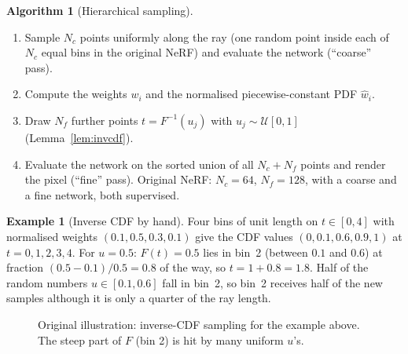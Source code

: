 \documentclass[11pt,a4paper]{article}
\theoremstyle{definition}
\newtheorem{example}{Example}[section]
\newtheorem{algorithm}{Algorithm}[section]
\theoremstyle{plain}
\begin{document}
\begin{algorithm}[Hierarchical sampling]\label{alg:hier}
\begin{enumerate}[nosep]
\item Sample $N_c$ points uniformly along the ray (one random point inside each of $N_c$ equal bins in the original NeRF) and evaluate the network (``coarse'' pass).
\item Compute the weights $w_i$ and the normalised piecewise-constant PDF $\hat w_i$.
\item Draw $N_f$ further points $t=F^{-1}(u_j)$ with $u_j\sim\mathcal U[0,1]$ (Lemma~\ref{lem:invcdf}).
\item Evaluate the network on the sorted union of all $N_c+N_f$ points and render the pixel (``fine'' pass). Original NeRF: $N_c=64$, $N_f=128$, with a coarse and a fine network, both supervised.
\end{enumerate}
\end{algorithm}

\begin{example}[Inverse CDF by hand]
Four bins of unit length on $t\in[0,4]$ with normalised weights $(0.1,0.5,0.3,0.1)$ give the CDF values $(0,0.1,0.6,0.9,1)$ at $t=0,1,2,3,4$. For $u=0.5$: $F(t)=0.5$ lies in bin~2 (between $0.1$ and $0.6$) at fraction $(0.5-0.1)/0.5=0.8$ of the way, so $t=1+0.8=1.8$. Half of the random numbers $u\in[0.1,0.6]$ fall in bin~2, so bin~2 receives half of the new samples although it is only a quarter of the ray length.
\end{example}

\begin{figure}[H]
\centering
{}
\caption{Original illustration: inverse-CDF sampling for the example above. The steep part of $F$ (bin 2) is hit by many uniform $u$'s.}
\end{figure}
\end{document}
